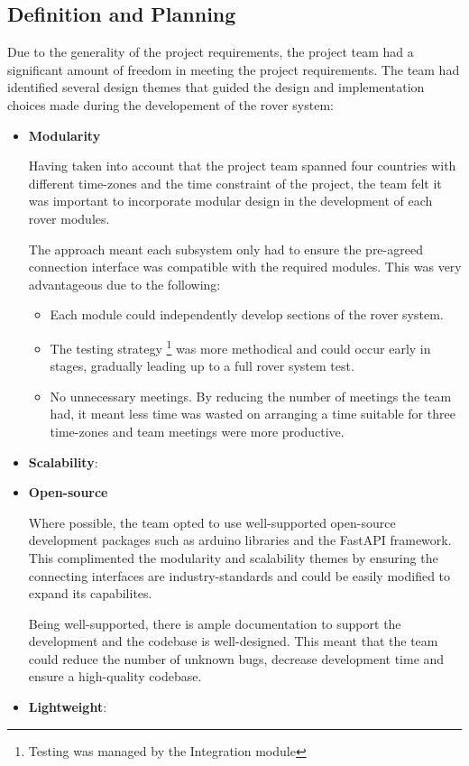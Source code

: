 \documentclass[11pt, a4paper]{article}
\begin{document}
\vfill

\pagebreak
\subsection{Definition and Planning}

Due to the generality of the project requirements, the project team had a significant amount of freedom in meeting the project requirements. The team had identified several design themes that guided the design and implementation choices made during the developement of the rover system:

\begin{itemize}    
    \item \textbf{Modularity}
    
    Having taken into account that the project team spanned four countries with different time-zones and the time constraint of the project, the team felt it was important to incorporate modular design in the development of each rover modules. 
    
    The approach meant each subsystem only had to ensure the pre-agreed connection interface was compatible with the required modules. This was very advantageous due to the following:
    \begin{itemize}
        \item Each module could independently develop sections of the rover system.
        \item The testing strategy \footnote{Testing was managed by the Integration module} was more methodical and could occur early in stages, gradually leading up to a full rover system test.
        \item No unnecessary meetings. By reducing the number of meetings the team had, it meant less time was wasted on arranging a time suitable for three time-zones and team meetings were more productive.  
    \end{itemize}

    \item \textbf{Scalability}:

    \item \textbf{Open-source}
    
    Where possible, the team opted to use well-supported open-source development packages such as arduino libraries and the FastAPI framework. This complimented the modularity and scalability themes by ensuring the connecting interfaces are industry-standards and could be easily modified to expand its capabilites. 
    
    Being well-supported, there is ample documentation to support the development and the codebase is well-designed. This meant that the team could reduce the number of unknown bugs, decrease development time and ensure a high-quality codebase.     

    \item \textbf{Lightweight}:
    
\end{itemize}
\end{document}
